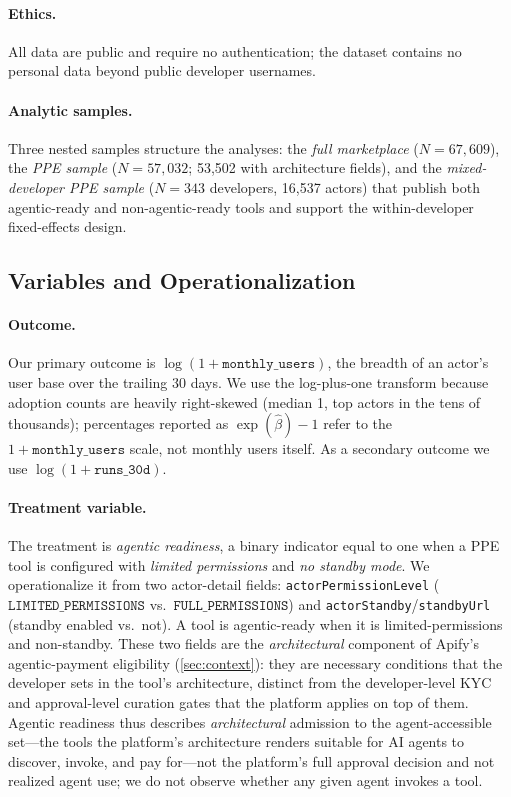 \paragraph{Ethics.} All data are public and require no authentication; the
dataset contains no personal data beyond public developer usernames.

\paragraph{Analytic samples.} Three nested samples structure the analyses: the
\emph{full marketplace} ($N = 67{,}609$), the \emph{PPE sample}
($N = 57{,}032$; 53{,}502 with architecture fields), and the
\emph{mixed-developer PPE sample} ($N = 343$ developers, 16{,}537 actors) that
publish both agentic-ready and non-agentic-ready tools and support the
within-developer fixed-effects design.

\subsection{Variables and Operationalization}
\label{sec:variables}

\paragraph{Outcome.}
Our primary outcome is $\log(1 + \texttt{monthly\_users})$, the breadth of an
actor's user base over the trailing 30 days. We use the log-plus-one transform
because adoption counts are heavily right-skewed (median 1, top actors in the
tens of thousands); percentages reported as $\exp(\hat\beta) - 1$ refer to the
$1 + \texttt{monthly\_users}$ scale, not monthly users itself. As a secondary
outcome we use $\log(1 + \texttt{runs\_30d})$.

\paragraph{Treatment variable.}
The treatment is \emph{agentic readiness}, a binary indicator equal to one when
a PPE tool is configured with \emph{limited permissions} and \emph{no standby
mode}. We operationalize it from two actor-detail fields:
\texttt{actorPermissionLevel} ($\texttt{LIMITED\_PERMISSIONS}$ vs.\
$\texttt{FULL\_PERMISSIONS}$) and \texttt{actorStandby}/\texttt{standbyUrl}
(standby enabled vs.\ not). A tool is agentic-ready when it is
limited-permissions and non-standby. These two fields are the
\emph{architectural} component of Apify's agentic-payment eligibility
(\autoref{sec:context}): they are necessary conditions that the developer sets
in the tool's architecture, distinct from the developer-level KYC and
approval-level curation gates that the platform applies on top of them. Agentic
readiness thus describes \emph{architectural} admission to the agent-accessible
set---the tools the platform's architecture renders suitable for AI agents to
discover, invoke, and pay for---not the platform's full approval decision and
not realized agent use; we do not observe whether any given agent invokes a
tool.

